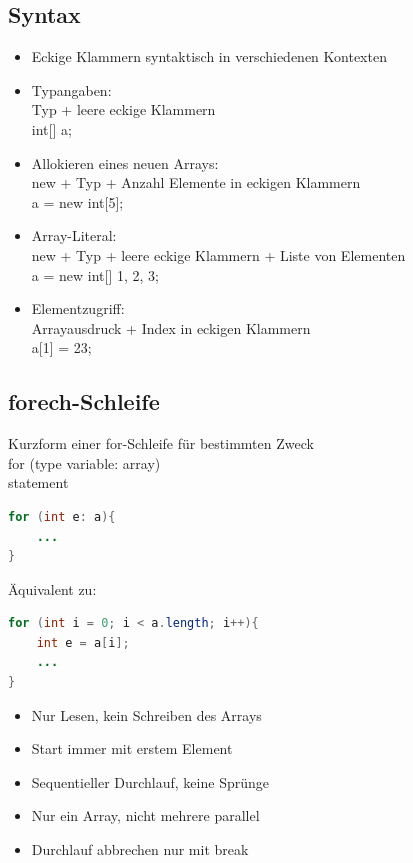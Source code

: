 \subsection{Syntax}
\begin{itemize}
\item Eckige Klammern syntaktisch in verschiedenen Kontexten
\item Typangaben:\\
Typ + leere eckige Klammern\\
int[] a;
\item Allokieren eines neuen Arrays:\\
new + Typ + Anzahl Elemente in eckigen Klammern\\
a = new int[5];
\item Array-Literal:\\
new + Typ + leere eckige Klammern + Liste von Elementen\\
a = new int[] {1, 2, 3};
\item Elementzugriff:\\
Arrayausdruck + Index in eckigen Klammern\\
a[1] = 23;
\end{itemize}

\subsection{forech-Schleife}
Kurzform einer for-Schleife für bestimmten Zweck\\
for (type variable: array)\\
statement\\
 \begin{lstlisting}[language=JAVA]
 for (int e: a){
 	...
}
\end{lstlisting}
Äquivalent zu:
 \begin{lstlisting}[language=JAVA]
for (int i = 0; i < a.length; i++){
	int e = a[i];
	...
}

\end{lstlisting}
\begin{itemize}
\item Nur Lesen, kein Schreiben des Arrays
\item Start immer mit erstem Element
\item Sequentieller Durchlauf, keine Sprünge
\item Nur ein Array, nicht mehrere parallel
\item Durchlauf abbrechen nur mit break
\end{itemize}